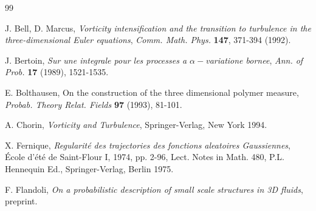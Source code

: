 \begin{thebibliography}{99}


  J. Bell, D. Marcus, \textit{Vorticity intensification and the
transition to turbulence in the three-dimensional Euler equations}, \textit{%
Comm. Math. Phys.} \textbf{147}, 371-394 (1992).

 J. Bertoin, \textit{Sur une integrale pour les processes a
  $\alpha-$variatione bornee}, \textit{Ann. of Prob.} \textbf{17}
  (1989), 1521-1535.


  E. Bolthausen, On the construction of the three dimensional
polymer measure, \textit{Probab. Theory Relat. Fields} \textbf{97} (1993),
81-101.

  A. Chorin, \textit{Vorticity and Turbulence}, Springer-Verlag,
New York 1994.


 X. Fernique, \textit{Regularit\'e des trajectories des fonctions
  aleatoires Gaussiennes}, \'Ecole d'\'{e}t\'{e}  de 
  Saint-Flour I, 1974, pp. 2-96,
  Lect. Notes in Math. 480, P.L. Hennequin Ed.,  
  Springer-Verlag, Berlin 1975. 


  F. Flandoli, \textit{On a probabilistic description of small
    scale structures in 3D fluids}, preprint.




\end{thebibliography}
